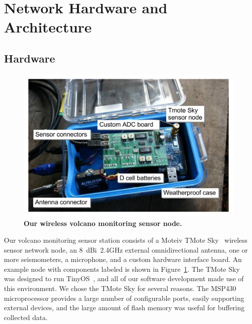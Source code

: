 \section{Network Hardware and Architecture}
\label{evaluation-sec-architecture}

\subsection{Hardware}

\begin{figure}[t]
\begin{center}
\includegraphics[width=1.0\hsize]{./3-evaluation/figs/node.pdf}
\end{center}
\caption{\textbf{Our wireless volcano monitoring sensor node.}}
\label{evaluation-fig-node}
\end{figure}

Our volcano monitoring sensor station consists of a Moteiv TMote
Sky~\cite{moteiv} wireless sensor network node, an 8~dBi~2.4GHz external
omnidirectional antenna, one or more seismometers, a microphone, and a custom
hardware interface board. An example node with components labeled is shown in
Figure~\ref{evaluation-fig-node}.  The TMote Sky was designed to run
TinyOS~\cite{tinyos-asplos00}, and all of our software development made use
of this environment. We chose the TMote Sky for several reasons. The MSP430
microprocessor provides a large number of configurable ports, easily
supporting external devices, and the large amount of flash memory was useful
for buffering collected data.

